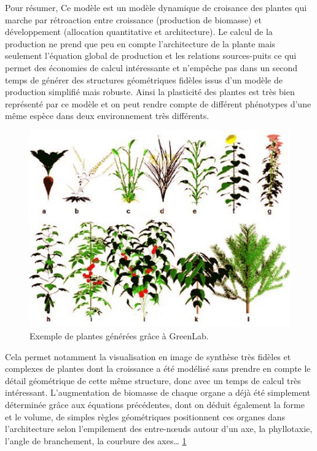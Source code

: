 {Pour résumer, Ce modèle est un modèle dynamique de croisance des plantes qui marche par rétroaction entre croissance (production de biomasse) et développement (allocation quantitative et architecture). Le calcul de la production ne prend que peu en compte l’architecture de la plante mais seulement l’équation global de production et les relations sources-puits ce qui permet des économies de calcul intéressante et n’empêche pas dans un second temps de générer des structures géométriques fidèles issus d’un modèle de production simplifié mais robuste. Ainsi la plasticité des plantes est très bien représenté par ce modèle et on peut rendre compte de différent phénotypes d’une même espèce dans deux environnement très différents.

\begin{figure}[h]
	\begin{center}
  \includegraphics[scale=1.0]{./img/exempleGL1.jpg}
  \caption{Exemple de plantes générées grâce à GreenLab.}
  \label{fig:exempleGL1}
  \end{center}
\end{figure}

Cela permet notamment la visualisation en image de synthèse très fidèles et complexes de plantes dont la croissance a été modélisé sans prendre en compte le détail géométrique de cette même structure, donc avec un temps de calcul très intéressant. L’augmentation de biomasse de chaque organe a déjà été simplement déterminée grâce aux équations précédentes, dont on déduit également la forme et le volume, de simples règles géométriques positionnent ces organes dans l’architecture selon l’empilement des entre-nœuds autour d’un axe, la phyllotaxie, l’angle de branchement, la courbure des axes… \ref{fig:exempleGL1}

}
